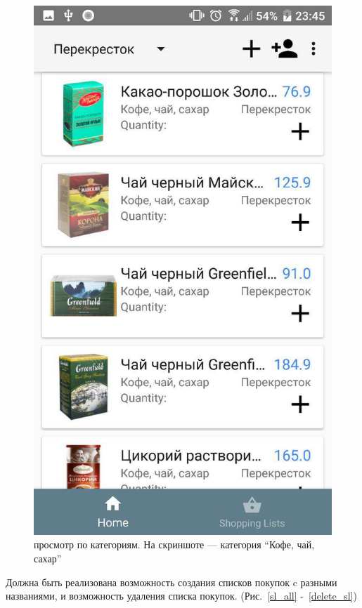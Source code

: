 \begin{figure}[h!]
    \includegraphics[height=0.38\textheight]{./screenshots/3/categ_filter.jpg}
    \caption{\small{просмотр по категориям. На скриншоте --- категория ``Кофе, чай, сахар''}}
    \label{categs_2}
    \endminipage{}
\end{figure}

Должна быть реализована возможность создания списков покупок c разными названиями,
и возможность удаления списка покупок. (Рис.~\ref{sl_all} -~\ref{delete_sl})


